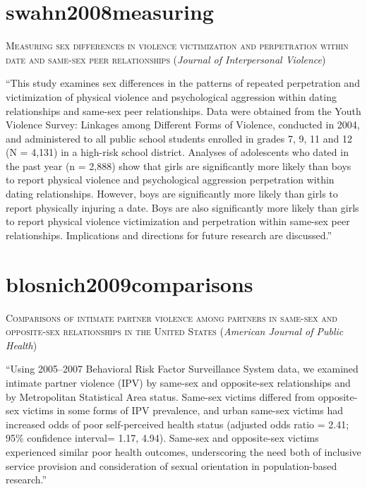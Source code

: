 \documentclass[]{tufte-handout}
\begin{document}
\section{\texorpdfstring{\textcolor[HTML]{5b0057}{swahn2008measuring}}{}}\label{section-38}

\textsc{\large{Measuring sex differences in violence victimization and perpetration within date and same-sex peer relationships}}
(\emph{Journal of Interpersonal Violence})

``This study examines sex differences in the patterns of repeated
perpetration and victimization of physical violence and psychological
aggression within dating relationships and same-sex peer relationships.
Data were obtained from the Youth Violence Survey: Linkages among
Different Forms of Violence, conducted in 2004, and administered to all
public school students enrolled in grades 7, 9, 11 and 12 (N = 4,131) in
a high-risk school district. Analyses of adolescents who dated in the
past year (n = 2,888) show that girls are significantly more likely than
boys to report physical violence and psychological aggression
perpetration within dating relationships. However, boys are
significantly more likely than girls to report physically injuring a
date. Boys are also significantly more likely than girls to report
physical violence victimization and perpetration within same-sex peer
relationships. Implications and directions for future research are
discussed.''

\section{\texorpdfstring{\textcolor[HTML]{5b0057}{blosnich2009comparisons}}{}}\label{section-39}

\textsc{\large{Comparisons of intimate partner violence among partners in same-sex and opposite-sex relationships in the United States}}
(\emph{American Journal of Public Health})

``Using 2005--2007 Behavioral Risk Factor Surveillance System data, we
examined intimate partner violence (IPV) by same-sex and opposite-sex
relationships and by Metropolitan Statistical Area status. Same-sex
victims differed from opposite-sex victims in some forms of IPV
prevalence, and urban same-sex victims had increased odds of poor
self-perceived health status (adjusted odds ratio = 2.41; 95\%
confidence interval= 1.17, 4.94). Same-sex and opposite-sex victims
experienced similar poor health outcomes, underscoring the need both of
inclusive service provision and consideration of sexual orientation in
population-based research.''
\end{document}
